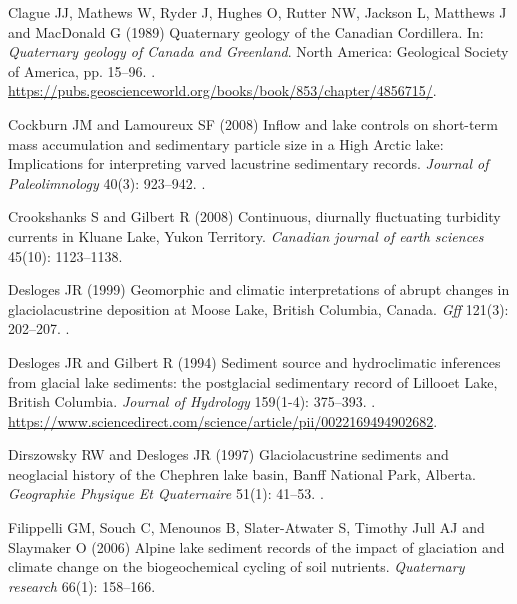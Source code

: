 \documentclass[Royal,times,doublespace,sageh]{sagej}
\begin{document}
\begin{thebibliography}{68}
Clague JJ, Mathews W, Ryder J, Hughes O, Rutter NW, Jackson L, Matthews J and
  MacDonald G (1989) {Quaternary geology of the Canadian Cordillera}.
\newblock In: \emph{Quaternary geology of Canada and Greenland}. North America:
  Geological Society of America, pp. 15--96.
\newblock {}.
\newblock
  \urlprefix\url{https://pubs.geoscienceworld.org/books/book/853/chapter/4856715/}.

Cockburn JM and Lamoureux SF (2008) {Inflow and lake controls on short-term
  mass accumulation and sedimentary particle size in a High Arctic lake:
  Implications for interpreting varved lacustrine sedimentary records}.
\newblock \emph{Journal of Paleolimnology} 40(3): 923--942.
\newblock {}.

Crookshanks S and Gilbert R (2008) {Continuous, diurnally fluctuating turbidity
  currents in Kluane Lake, Yukon Territory}.
\newblock \emph{Canadian journal of earth sciences} 45(10): 1123--1138.

Desloges JR (1999) {Geomorphic and climatic interpretations of abrupt changes
  in glaciolacustrine deposition at Moose Lake, British Columbia, Canada}.
\newblock \emph{Gff} 121(3): 202--207.
\newblock {}.

Desloges JR and Gilbert R (1994) {Sediment source and hydroclimatic inferences
  from glacial lake sediments: the postglacial sedimentary record of Lillooet
  Lake, British Columbia}.
\newblock \emph{Journal of Hydrology} 159(1-4): 375--393.
\newblock {}.
\newblock
  \urlprefix\url{https://www.sciencedirect.com/science/article/pii/0022169494902682}.

Dirszowsky RW and Desloges JR (1997) {Glaciolacustrine sediments and neoglacial
  history of the Chephren lake basin, Banff National Park, Alberta}.
\newblock \emph{Geographie Physique Et Quaternaire} 51(1): 41--53.
\newblock {}.

Filippelli GM, Souch C, Menounos B, Slater-Atwater S, {Timothy Jull} AJ and
  Slaymaker O (2006) {Alpine lake sediment records of the impact of glaciation
  and climate change on the biogeochemical cycling of soil nutrients}.
\newblock \emph{Quaternary research} 66(1): 158--166.


\end{thebibliography}
\end{document}
